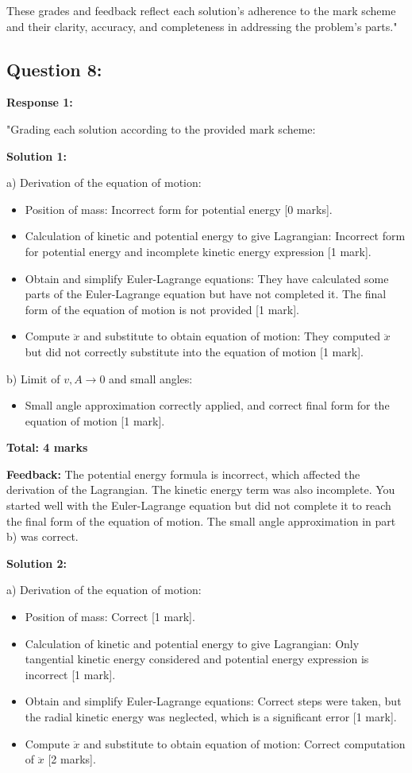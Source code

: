 \documentclass[a4paper,11pt]{article}
\begin{document}
These grades and feedback reflect each solution's adherence to the mark scheme and their clarity, accuracy, and completeness in addressing the problem's parts."

\subsection*{Question 8:}

\textbf{Response 1:}

"Grading each solution according to the provided mark scheme:

\textbf{Solution 1:}

a) Derivation of the equation of motion:
\begin{itemize}
  \item Position of mass: Incorrect form for potential energy [0 marks].
  \item Calculation of kinetic and potential energy to give Lagrangian: Incorrect form for potential energy and incomplete kinetic energy expression [1 mark].
  \item Obtain and simplify Euler-Lagrange equations: They have calculated some parts of the Euler-Lagrange equation but have not completed it. The final form of the equation of motion is not provided [1 mark].
  \item Compute \( \ddot{x} \) and substitute to obtain equation of motion: They computed \( \ddot{x} \) but did not correctly substitute into the equation of motion [1 mark].
\end{itemize}

b) Limit of \( v, A \rightarrow 0 \) and small angles:
\begin{itemize}
  \item Small angle approximation correctly applied, and correct final form for the equation of motion [1 mark].
\end{itemize}

\textbf{Total: 4 marks}

\textbf{Feedback:}
The potential energy formula is incorrect, which affected the derivation of the Lagrangian. The kinetic energy term was also incomplete. You started well with the Euler-Lagrange equation but did not complete it to reach the final form of the equation of motion. The small angle approximation in part b) was correct.

\textbf{Solution 2:}

a) Derivation of the equation of motion:
\begin{itemize}
  \item Position of mass: Correct [1 mark].
  \item Calculation of kinetic and potential energy to give Lagrangian: Only tangential kinetic energy considered and potential energy expression is incorrect [1 mark].
  \item Obtain and simplify Euler-Lagrange equations: Correct steps were taken, but the radial kinetic energy was neglected, which is a significant error [1 mark].
  \item Compute \( \ddot{x} \) and substitute to obtain equation of motion: Correct computation of \( \ddot{x} \) [2 marks].
\end{itemize}
\end{document}
